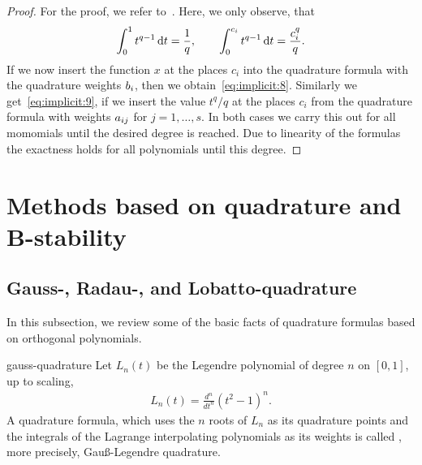 


\begin{proof}
  For the proof, we refer to~\cite[Ch. II, Theorem
  7.4]{HairerNorsettWanner93}. Here, we only observe, that
  \begin{gather*}
    \int_0^1 t^{q-1} \,\mathrm{d} t = \frac1{q}, \qquad
    \int_0^{c_i} t^{q-1} \,\mathrm{d} t = \frac{c_i^{q}}{q}.
  \end{gather*}
  If we now insert the function $x$ at the places $c_i$ into the
  quadrature formula with the quadrature weights $b_i$, then we
  obtain~\eqref{eq:implicit:8}. Similarly we get~\eqref{eq:implicit:9}, if we insert the value $t^{q}/q$ at
  the places $c_i$ from the quadrature formula with weights
  $a_{ij}$ for $j=1,\dots,s$. In both cases we carry this out for
  all momomials until the desired degree is reached.  Due to linearity
  of the formulas the exactness holds for all polynomials until this
  degree.
\end{proof}

\section{Methods based on quadrature and B-stability}

\subsection{Gauss-, Radau-, and Lobatto-quadrature}

\begin{intro}
  In this subsection, we review some of the basic facts of quadrature
  formulas based on orthogonal polynomials.
\end{intro}

\begin{Definition}{gauss-quadrature}
  Let $L_n(t)$ be the Legendre polynomial of degree $n$ on $[0,1]$, up
  to scaling,
  \begin{gather*}
    L_n(t) = \frac{d^{n}}{dt^{n}}(t^2-1)^{n}.
  \end{gather*}
  A quadrature formula, which uses the $n$ roots of $L_n$ as its
  quadrature points and the integrals of the Lagrange interpolating
  polynomials as its weights is called , more
  precisely, Gauß-Legendre quadrature.
\end{Definition}

